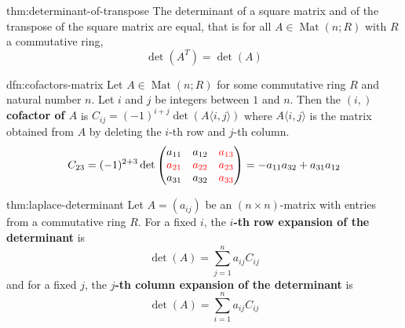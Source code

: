 \documentclass[landscape, 8pt]{extarticle}
\DeclareMathOperator{\sgn}{sgn}
\DeclareMathOperator{\Mat}{Mat}
\begin{document}
\begin{multicols}{3}
\begin{thm}{thm:determinant-of-transpose}{}
    The determinant of a square matrix and of the transpose of the square matrix are equal, that is for all $A\in \Mat(n;R)$ with $R$ a commutative ring,
    \[\det(A^{T}) = \det(A)\]
\end{thm}



\begin{dfn}{dfn:cofactors-matrix}{}
    Let $A \in \Mat(n;R)$ for some commutative ring $R$ and natural number $n$. Let $i$ and $j$ be integers between $1$ and $n$. Then the $(i, )$ \textbf{cofactor of $A$} is $C_{ij} = (-1)^{i + j} \det(A\langle i,j \rangle)$ where $A\langle i, j \rangle$ is the matrix obtained from $A$ by deleting the $i$-th row and $j$-th column.
    \[C_{23} = (-1)^{2 + 3} \det \begin{pmatrix}
        a_{11} & a_{12}& \textcolor{red}{a_{13}}\\
        \textcolor{red}{a_{21}}& \textcolor{red}{a_{22}}& \textcolor{red}{a_{23}}\\
        a_{31}& a_{32}& \textcolor{red}{a_{33}}
    \end{pmatrix} = -a_{11}a_{32} + a_{31}a_{12}\]
\end{dfn}

\begin{thm}{thm:laplace-determinant}{}
    Let $A = (a_{ij})$ be an $(n \times n)$-matrix with entries from a commutative ring $R$. For a fixed $i$, the \textbf{$i$-th row expansion of the determinant} is
    \[\det(A) = \sum_{j = 1}^{n}a_{ij}C_{ij}\]
    and for a fixed $j$, the \textbf{$j$-th column expansion of the determinant} is
    \[\det(A) = \sum_{i = 1}^{n} a_{ij} C_{ij}\]
\end{thm}


\end{multicols}
\end{document}
